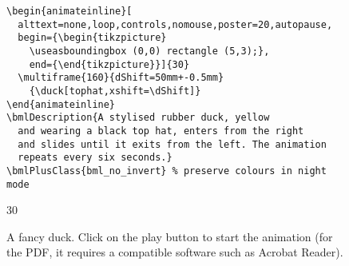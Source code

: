 \documentclass[a4paper,british]{article}
\begin{document}
\begin{figure}
  \begin{lstlisting}[style=bookml]
\begin{animateinline}[
  alttext=none,loop,controls,nomouse,poster=20,autopause,
  begin={\begin{tikzpicture}
    \useasboundingbox (0,0) rectangle (5,3);},
    end={\end{tikzpicture}}]{30}
  \multiframe{160}{dShift=50mm+-0.5mm}
    {\duck[tophat,xshift=\dShift]}
\end{animateinline}
\bmlDescription{A stylised rubber duck, yellow
  and wearing a black top hat, enters from the right
  and slides until it exits from the left. The animation
  repeats every six seconds.}
\bmlPlusClass{bml_no_invert} % preserve colours in night mode
  \end{lstlisting}
  \begin{center}
    \begin{animateinline}[
      alttext=none,loop,controls,nomouse,poster=20,autopause,
      poster=20,autopause,
      begin={\begin{tikzpicture}%
        \useasboundingbox (0,0) rectangle (5,3);},
        end={\end{tikzpicture}}]{30}
        {\duck[tophat,xshift=\dShift]}
    \end{animateinline}
  \end{center}
  \caption{A fancy duck. Click on the play button to start the animation (for the PDF, it requires a compatible software such as Acrobat Reader).}
  \label{fig:duck}
\end{figure}
\end{document}
